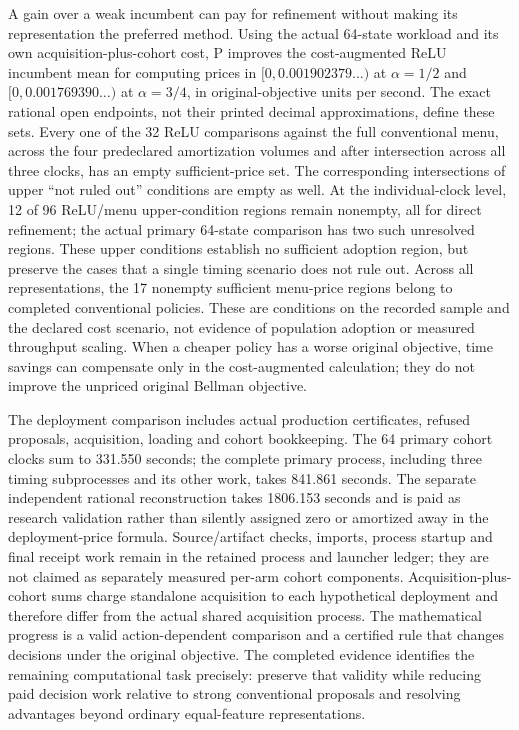 A gain over a weak incumbent can pay for refinement without making its
representation the preferred method. Using the actual 64-state workload
and its own acquisition-plus-cohort cost, P improves the cost-augmented
ReLU incumbent mean for computing prices in
$[0,0.001902379\ldots)$ at $\alpha=1/2$ and
$[0,0.001769390\ldots)$ at $\alpha=3/4$, in original-objective units per
second. The exact rational open endpoints, not their printed decimal
approximations, define these sets. Every one of the 32 ReLU comparisons
against the full conventional menu, across the four predeclared amortization
volumes and after intersection across all three clocks, has an empty
sufficient-price set. The corresponding intersections of upper
``not ruled out'' conditions are empty as well. At the individual-clock level,
12 of 96 ReLU/menu upper-condition regions remain nonempty, all for direct
refinement; the actual primary 64-state comparison has two such unresolved
regions. These upper conditions establish no sufficient adoption region,
but preserve the cases that a single timing scenario does not rule out.
Across all representations,
the 17 nonempty sufficient menu-price regions belong to completed
conventional policies. These are conditions on the recorded sample and the
declared cost scenario, not evidence of population adoption or measured
throughput scaling. When a cheaper policy has a worse original objective,
time savings can compensate only in the cost-augmented calculation; they do
not improve the unpriced original Bellman objective.

The deployment comparison includes actual production certificates, refused
proposals, acquisition, loading and cohort bookkeeping. The 64 primary
cohort clocks sum to 331.550 seconds; the complete primary process, including
three timing subprocesses and its other work, takes 841.861 seconds.
The separate independent rational reconstruction takes 1806.153 seconds
and is paid as research validation rather than silently assigned zero or
amortized away in the deployment-price formula. Source/artifact checks,
imports, process startup and final receipt work remain in the retained
process and launcher ledger; they are not claimed as separately measured
per-arm cohort components. Acquisition-plus-cohort sums charge standalone
acquisition to each hypothetical deployment and therefore differ from
the actual shared acquisition process. The mathematical progress is a valid
action-dependent comparison and a certified rule that changes decisions
under the original objective. The completed evidence identifies the
remaining computational task precisely: preserve that validity while
reducing paid decision work relative to strong conventional proposals and
resolving advantages beyond ordinary equal-feature representations.
